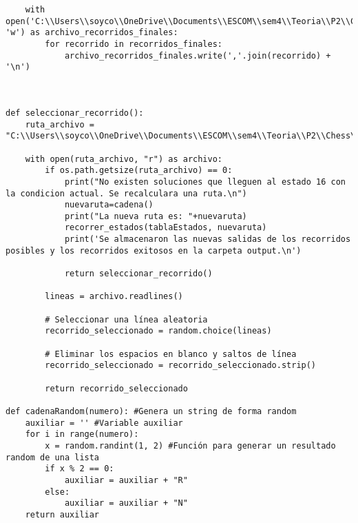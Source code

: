 \begin{lstlisting}
    with open('C:\\Users\\soyco\\OneDrive\\Documents\\ESCOM\\sem4\\Teoria\\P2\\Chess\\output\\recorridos_finales_blanca.txt', 'w') as archivo_recorridos_finales:
        for recorrido in recorridos_finales:
            archivo_recorridos_finales.write(','.join(recorrido) + '\n')



def seleccionar_recorrido():
    ruta_archivo = "C:\\Users\\soyco\\OneDrive\\Documents\\ESCOM\\sem4\\Teoria\\P2\\Chess\\output\\recorridos_finales_blanca.txt"
    
    with open(ruta_archivo, "r") as archivo:
        if os.path.getsize(ruta_archivo) == 0:
            print("No existen soluciones que lleguen al estado 16 con la condicion actual. Se recalculara una ruta.\n")
            nuevaruta=cadena()
            print("La nueva ruta es: "+nuevaruta)
            recorrer_estados(tablaEstados, nuevaruta)
            print('Se almacenaron las nuevas salidas de los recorridos posibles y los recorridos exitosos en la carpeta output.\n')
            
            return seleccionar_recorrido()
            
        lineas = archivo.readlines()
        
        # Seleccionar una línea aleatoria
        recorrido_seleccionado = random.choice(lineas)
        
        # Eliminar los espacios en blanco y saltos de línea
        recorrido_seleccionado = recorrido_seleccionado.strip()
        
        return recorrido_seleccionado

def cadenaRandom(numero): #Genera un string de forma random 
    auxiliar = '' #Variable auxiliar
    for i in range(numero):
        x = random.randint(1, 2) #Función para generar un resultado random de una lista
        if x % 2 == 0:
            auxiliar = auxiliar + "R"
        else:
            auxiliar = auxiliar + "N"
    return auxiliar


\end{lstlisting}

